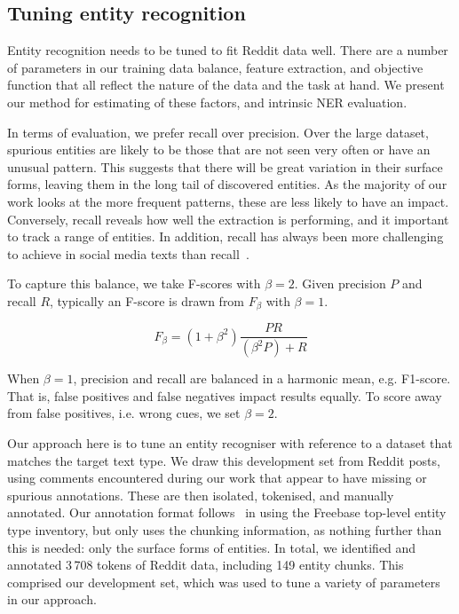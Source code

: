 \documentclass[journal,10pt,draftclsnofoot,onecolumn]{IEEEtran}
\begin{document}
\subsection{Tuning entity recognition}

Entity recognition needs to be tuned to fit Reddit data well.
There are a number of parameters in our training data balance, feature extraction, and objective function that all reflect the nature of the data and the task at hand.
We present our method for estimating of these factors, and intrinsic NER evaluation.

In terms of evaluation, we prefer recall over precision.
Over the large dataset, spurious entities are likely to be those that are not seen very often or have an unusual pattern.
This suggests that there will be great variation in their surface forms, leaving them in the long tail of discovered entities.
As the majority of our work looks at the more frequent patterns, these are less likely to have an impact.
Conversely, recall reveals how well the extraction is performing, and it important to track a range of entities.
In addition, recall has always been more challenging to achieve in social media texts than recall~\cite{ritter2011named,derczynski2015analysis}.

To capture this balance, we take F-scores with $\beta=2$.
Given precision $P$ and recall $R$, typically an F-score is drawn from $F_\beta$ with $\beta=1$.

\begin{equation}
F_\beta = (1+\beta^2)\frac{PR}{(\beta^2 P) + R} 
\end{equation}

When $\beta=1$, precision and recall are balanced in a harmonic mean, e.g. F1-score.
That is, false positives and false negatives impact results equally.
To score away from false positives, i.e. wrong cues, we set $\beta=2$.

Our approach here is to tune an entity recogniser with reference to a dataset that matches the target text type.
We draw this development set from Reddit posts, using comments encountered during our work that appear to have missing or spurious annotations.
These are then isolated, tokenised, and manually annotated.
Our annotation format follows~\cite{ritter2011named} in using the Freebase top-level entity type inventory, but only uses the chunking information, as nothing further than this is needed: only the surface forms of entities.
In total, we identified and annotated 3\,708 tokens of Reddit data, including 149 entity chunks.
This comprised our development set, which was used to tune a variety of parameters in our approach.
\end{document}
